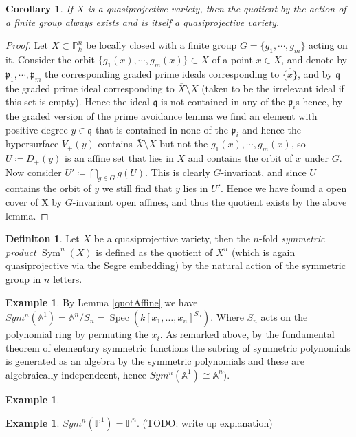 \documentclass[11pt, a4paper, german]{article}
\theoremstyle{plain}
\newtheorem{corollary}[theorem]{Corollary}
\theoremstyle{definition}
\newtheorem{definition}[theorem]{Definiton}
\newtheorem{remark}[theorem]{Remark}
\newtheorem{example}[theorem]{Example}
\DeclareMathOperator{\Spec}{Spec}
\DeclareMathOperator{\Sym}{Sym}
\DeclareMathOperator{\Proj}{Proj}
\begin{document}
\begin{corollary}
    If $X$ is a quasiprojective variety, then the quotient by the action of a finite group always exists and is itself a quasiprojective variety.
\end{corollary}
\begin{proof}
    Let $X \subset \mathbb{P}_k^n$ be locally closed with a finite group $G = \{g_1,\cdots,g_m\}$ acting on it. 
    Consider the orbit $\{g_1(x),\cdots,g_m(x)\} \subset X$ of a point $x \in X$, and denote by $\mathfrak{p}_1,\cdots,\mathfrak{p}_m$ the 
    corresponding graded prime ideals corresponding to $\overline{\{x\}}$, and by $\mathfrak{q}$ the graded prime ideal corresponding to
    $\overline{X} \setminus X$ (taken to be the irrelevant ideal if this set is empty). 
    Hence the ideal $\mathfrak{q}$ is not contained in any of the $\mathfrak{p}_i$s hence, by the graded version of the prime
    avoidance lemma we find an element with positive degree $y \in \mathfrak{q}$ that is contained in none of the $\mathfrak{p}_i$ and hence
    the hypersurface $V_+(y)$ contains $\bar{X} \setminus X$ but not the $g_1(x),\cdots,g_m(x)$, so $U \coloneqq D_+(y)$ 
    is an affine set that lies in $X$ and contains the orbit of $x$ under $G$. Now consider $U' \coloneqq \bigcap_{g \in G} g(U)$. This is clearly
    $G$-invariant, and since $U$ contains the orbit of $y$ we still find that $y$ lies in $U'$. Hence we have found a open cover of X by
    $G$-invariant open affines, and thus the quotient exists by the above lemma.
\end{proof}


\begin{definition}
    \label{symdef}
    Let $X$ be a quasiprojective variety, then the $n$-fold \emph{symmetric product} $\Sym^n(X)$ is defined as the quotient of $X^n$
    (which is again quasiprojective via the Segre embedding) by the natural action of the symmetric group in $n$ letters.
\end{definition}

\begin{example}
    By Lemma \ref{quotAffine} we have $Sym^n(\mathbb{A}^1) = \mathbb{A}^n/S_n = \Spec(k[x_1,\dots,x_n]^{S_n}).$ Where $S_n$ acts on the
    polynomial ring by permuting the $x_i$. As remarked above, by the fundamental theorem of elementary symmetric functions the subring
    of symmetric polynomials is generated as an algebra by the symmetric polynomials and these are algebraically independeent, hence
    $Sym^n(\mathbb{A}^1) \cong \mathbb{A}^n)$.
\end{example}
\begin{example}

\end{example}
\begin{example}
    $Sym^n(\mathbb{P}^1) = \mathbb{P}^n$. (TODO: write up explanation)
\end{example}
\end{document}
